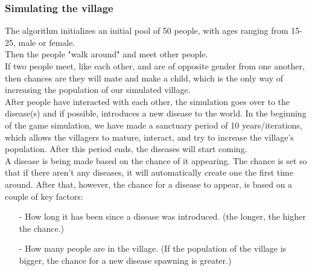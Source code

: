 \documentclass[conference,compsoc]{IEEEtran}
\begin{document}
\subsubsection{Simulating the village}
The algorithm initializes an initial pool of 50 people, with ages ranging from 15-25, male or female.\\
Then the people "walk around" and meet other people.\\
If two people meet, like each other, and are of opposite gender from one another, then chances are they will mate and make a child, which is the only way of increasing the population of our simulated village.\\
After people have interacted with each other, the simulation goes over to the disease(s) and if possible, introduces a new disease to the world. In the beginning of the game simulation, we have made a sanctuary period of 10 years/iterations, which allows the villagers to mature, interact, and try to increase the village's population. After this period ends, the diseases will start coming.\\
A disease is being made based on the chance of it appearing. The chance is set so that if there aren't any diseases, it will automatically create one the first time around. After that, however, the chance for a disease to appear, is based on a couple of key factors:\\
\begin{itemize}
\item[-] How long it has been since a disease was introduced. (the longer, the higher the chance.)
\item[-] How many people are in the village. (If the population of the village is bigger, the chance for a new disease spawning is greater.)
\end{itemize}
\end{document}
